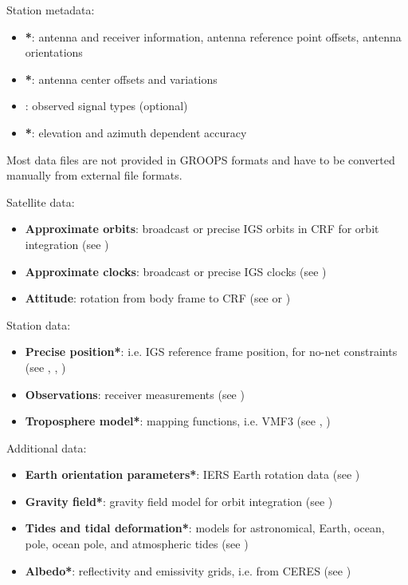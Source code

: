 Station metadata:
\begin{itemize}
  \item {}\textbf{*}: antenna and receiver information, antenna reference point
        offsets, antenna orientations
  \item {}\textbf{*}: antenna center offsets and variations
  \item {}: observed signal types (optional)
  \item {}\textbf{*}: elevation and azimuth dependent accuracy
\end{itemize}

Most data files are not provided in GROOPS formats and have to be converted manually from external file formats.

Satellite data:
\begin{itemize}
  \item \textbf{Approximate orbits}: broadcast or precise IGS orbits in CRF for orbit integration (see )
  \item \textbf{Approximate clocks}: broadcast or precise IGS clocks (see )
  \item \textbf{Attitude}: rotation from body frame to CRF (see  or )
\end{itemize}

Station data:
\begin{itemize}
  \item \textbf{Precise position}\textbf{*}: i.e. IGS reference frame position, for no-net constraints (see ,
        , )
  \item \textbf{Observations}: receiver measurements (see )
  \item \textbf{Troposphere model}\textbf{*}: mapping functions, i.e. VMF3 (see ,
        )
\end{itemize}

Additional data:
\begin{itemize}
  \item \textbf{Earth orientation parameters}\textbf{*}: IERS Earth rotation data
        (see )
  \item \textbf{Gravity field}\textbf{*}: gravity field model for orbit integration
        (see )
  \item \textbf{Tides and tidal deformation}\textbf{*}: models for astronomical, Earth, ocean, pole, ocean pole,
        and atmospheric tides (see )
  \item \textbf{Albedo}\textbf{*}: reflectivity and emissivity grids, i.e. from CERES
        (see )
\end{itemize}


